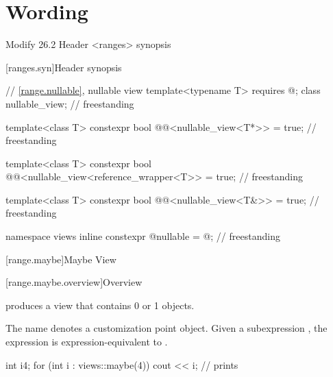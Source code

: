 \documentclass[a4paper,10pt,oneside,openany,final,article]{memoir}
\begin{document}
\chapter{Wording}


\begin{wording}


Modify 26.2 Header <ranges> synopsis

[ranges.syn]{Header  synopsis}

\begin{adjustwidth}{1cm}{1cm}
  \begin{addedblock}
    \begin{codeblock}
// \ref{range.nullable}, nullable view
template<typename T>
requires @\seebelow@;
class nullable_view;                                       // freestanding

template<class T>
constexpr bool
@@<nullable_view<T*>> = true;  // freestanding

template<class T>
constexpr bool
@@<nullable_view<reference_wrapper<T>> = true;  // freestanding

template<class T>
constexpr bool
@@<nullable_view<T&>> = true;  // freestanding

namespace views {
  inline constexpr @\unspec@ nullable = @\unspec@;          // freestanding
}



    \end{codeblock}
  \end{addedblock}
\end{adjustwidth}

[range.maybe]{Maybe View}

[range.maybe.overview]{Overview}

\pnum
{} produces a view that contains 0 or 1 objects.


\pnum
{}%
The name  denotes a
customization point object.
Given a subexpression , the expression
 is expression-equivalent to
.


\begin{example}
  \begin{codeblock}
int i{4};
for (int i : views::maybe(4))
  cout << i;        // prints 


\end{codeblock}
\end{example}
\end{wording}
\end{document}
